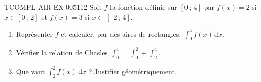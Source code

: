 \begin{exercice}{TCOMPL-AIR-EX-005}{1}{12}
Soit $f$ la fonction définie sur $[0\,;\,4]$ par $f(x)=2$ si $x\in[0\,;\,2]$
et $f(x)=3$ si $x\in\left]2\,;\,4\right]$.
\begin{enumerate}
  \item Représenter $f$ et calculer, par des aires de rectangles,
        $\displaystyle\int_0^4 f(x)\,\mathrm{d}x$.
  \item Vérifier la relation de Chasles
        $\displaystyle\int_0^4=\int_0^2+\int_2^4$.
  \item Que vaut $\displaystyle\int_2^2 f(x)\,\mathrm{d}x$ ? Justifier
        géométriquement.
\end{enumerate}
\end{exercice}

